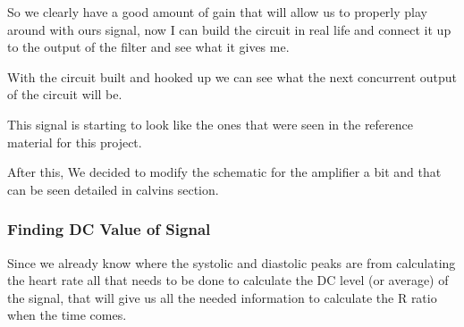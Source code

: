 \documentclass{article}
\begin{document}
So we clearly have a good amount of gain that will allow us to properly play around with ours signal, now I can build the circuit in real life and connect it up to the output of the filter and see what it gives me.
\begin{center}
\end{center}
With the circuit built and hooked up we can see what the next concurrent output of the circuit will be.
\begin{center}
\end{center}
This signal is starting to look like the ones that were seen in the reference material for this project.

After this, We decided to modify the schematic for the amplifier a bit and that can be seen detailed in calvins section.
\newpage
\subsubsection{Finding DC Value of Signal}

Since we already know where the systolic and diastolic peaks are from calculating the heart rate all that needs to be done to calculate the DC level (or average) of the signal, that will give us all the needed information to calculate the R ratio when the time comes.
\end{document}
